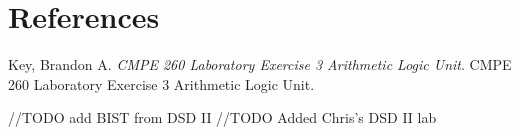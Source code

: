 \documentclass[11pt]{article}
\begin{document}
		
		
		
		
		

		
\section{References}

	Key, Brandon A. \textit{CMPE 260 Laboratory Exercise 3 Arithmetic Logic Unit}. CMPE 260 Laboratory Exercise 3 Arithmetic Logic Unit.
	
	//TODO add BIST from DSD II
	//TODO Added Chris's DSD II lab
\end{document}
